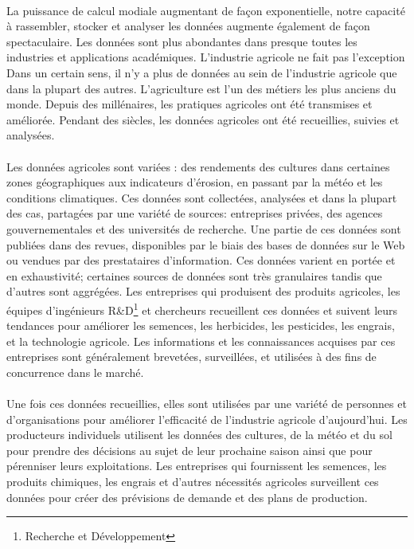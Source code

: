 \paragraph{}
La puissance de calcul modiale augmentant de façon exponentielle, notre capacité à rassembler, stocker et analyser les données augmente également de façon spectaculaire. Les données sont plus abondantes dans presque toutes les industries et applications académiques. L'industrie agricole ne fait pas l'exception Dans un certain sens, il n'y a plus de données au sein de l'industrie agricole que dans la plupart des autres. L'agriculture est l'un des métiers les plus anciens du monde. Depuis des millénaires, les pratiques agricoles ont été transmises et améliorée. Pendant des siècles, les données agricoles ont été recueillies, suivies et analysées\cite{MIT-BIGDATA}.
\paragraph{}
Les données agricoles sont variées : des rendements des cultures dans certaines zones géographiques aux indicateurs d'érosion, en passant par la météo et les conditions climatiques. Ces données sont collectées, analysées et dans la plupart des cas, partagées par une variété de sources: entreprises privées, des agences gouvernementales et des universités de recherche. Une partie de ces données sont publiées dans des revues, disponibles par le biais des bases de données sur le Web ou vendues par des prestataires d'information. Ces données varient en portée et en exhaustivité; certaines sources de données sont très granulaires tandis que d'autres sont aggrégées.
Les entreprises qui produisent des produits agricoles, les équipes d'ingénieurs R\&D\footnote{Recherche et Développement} et chercheurs recueillent ces données et suivent leurs tendances pour améliorer les semences, les herbicides, les pesticides, les engrais, et la technologie agricole. Les informations et les connaissances acquises par ces entreprises sont généralement brevetées, surveillées, et utilisées à des fins de concurrence dans le marché. 
\paragraph{}
Une fois ces données recueillies, elles sont utilisées par une variété de personnes et d'organisations pour améliorer l'efficacité de l'industrie agricole d'aujourd'hui. Les producteurs individuels utilisent les données des cultures, de la météo et du sol pour prendre des décisions au sujet de leur prochaine saison ainsi que pour pérenniser leurs exploitations. Les entreprises qui fournissent les semences, les produits chimiques, les engrais et d'autres nécessités agricoles surveillent ces données pour créer des prévisions de demande et des plans de production.
